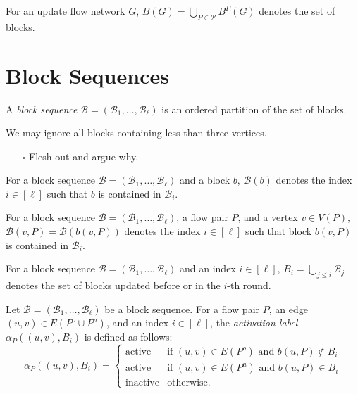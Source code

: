 \documentclass[fontsize=11pt,paper=a4]{book}
\begin{document}
\begin{notation}
For an update flow network \(G\), \(B(G)=\bigcup_{P\in\mathcal{P}}B^P(G)\) denotes the set of blocks.
\label{org8ecbe6a}
\end{notation}

\chapter{Block Sequences}
\label{sec:org94c7c4b}

\begin{defn}
A \emph{block sequence} \(\mathcal{B}=(\mathscr{B}_1,\dots,\mathscr{B}_{\ell})\) is an ordered partition of the set of blocks.
\label{org13196ad}
\end{defn}

\begin{remark}
We may ignore all blocks containing less than three vertices.
\label{org50cc955}
\end{remark}

\begin{itemize}
\item[{$\square$}] Flesh out and argue why.
\end{itemize}

\begin{notation}
For a block sequence \(\mathcal{B}=(\mathscr{B}_1,\dots,\mathscr{B}_{\ell})\) and a block \(b\), \(\mathcal{B}(b)\) denotes the index \(i\in[\ell]\) such that \(b\) is contained in \(\mathscr{B}_i\).
\label{org78c9a03}
\end{notation}

\begin{notation}
For a block sequence \(\mathcal{B}=(\mathscr{B}_1,\dots,\mathscr{B}_{\ell})\), a flow pair \(P\), and a vertex \(v\in V(P)\), \(\mathcal{B}(v,P)=\mathcal{B}(b(v,P))\) denotes the index \(i\in[\ell]\) such that block \(b(v,P)\) is contained in \(\mathscr{B}_i\).
\label{orgefe9042}
\end{notation}

\begin{notation}
For a block sequence \(\mathcal{B}=(\mathscr{B}_1,\dots,\mathscr{B}_{\ell})\) and an index \(i\in[\ell]\), \(B_i=\bigcup_{j\leq i}\mathscr{B}_j\) denotes the set of blocks updated before or in the \(i\)-th round.
\label{org7110eb0}
\end{notation}

\begin{defn}
Let \(\mathcal{B}=(\mathscr{B}_1,\dots,\mathscr{B}_{\ell})\) be a block sequence.
For a flow pair \(P\), an edge \((u,v)\in E(P^o\cup P^u)\), and an index \(i\in[\ell]\), the \emph{activation label} \(\alpha_P((u,v),B_i)\) is defined as follows:
\[\alpha_P((u,v),B_i)=
\begin{cases}
\mathrm{active} & \text{if }(u,v)\in E(P^o)\text{ and }b(u,P)\notin B_i\\
\mathrm{active} & \text{if }(u,v)\in E(P^u)\text{ and }b(u,P)\in B_i\\
\mathrm{inactive} & \text{otherwise}.
\end{cases}\]
\label{org14af385}
\end{defn}
\end{document}
